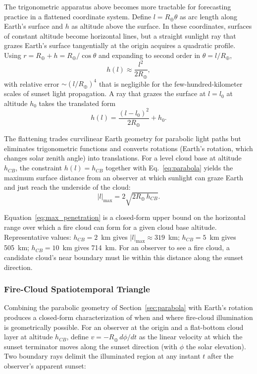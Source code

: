\documentclass[11pt,a4paper]{article}
\begin{document}
The trigonometric apparatus above becomes more tractable for forecasting practice in a flattened coordinate system. Define $l = R_\oplus \theta$ as arc length along Earth's surface and $h$ as altitude above the surface. In these coordinates, surfaces of constant altitude become horizontal lines, but a straight sunlight ray that grazes Earth's surface tangentially at the origin acquires a quadratic profile. Using $r = R_\oplus + h = R_\oplus / \cos\theta$ and expanding to second order in $\theta = l / R_\oplus$,
\begin{equation}
h(l) \approx \frac{l^2}{2 R_\oplus},
\label{eq:parabola}
\end{equation}
with relative error $\sim (l / R_\oplus)^4$ that is negligible for the few-hundred-kilometer scales of sunset light propagation. A ray that grazes the surface at $l = l_0$ at altitude $h_0$ takes the translated form
\begin{equation}
h(l) = \frac{(l - l_0)^2}{2 R_\oplus} + h_0.
\label{eq:parabola_translated}
\end{equation}

The flattening trades curvilinear Earth geometry for parabolic light paths but eliminates trigonometric functions and converts rotations (Earth's rotation, which changes solar zenith angle) into translations. For a level cloud base at altitude $h_{CB}$, the constraint $h(l) = h_{CB}$ together with Eq.~\ref{eq:parabola} yields the maximum surface distance from an observer at which sunlight can graze Earth and just reach the underside of the cloud:
\begin{equation}
|l|_{\max} = 2 \sqrt{2 R_\oplus \, h_{CB}}.
\label{eq:max_penetration}
\end{equation}

Equation~\ref{eq:max_penetration} is a closed-form upper bound on the horizontal range over which a fire cloud can form for a given cloud base altitude. Representative values: $h_{CB} = 2$~km gives $|l|_{\max} \approx 319$~km; $h_{CB} = 5$~km gives 505~km; $h_{CB} = 10$~km gives 714~km. For an observer to see a fire cloud, a candidate cloud's near boundary must lie within this distance along the sunset direction.

\subsubsection{Fire-Cloud Spatiotemporal Triangle}
\label{sec:triangle}

Combining the parabolic geometry of Section~\ref{sec:parabola} with Earth's rotation produces a closed-form characterization of when and where fire-cloud illumination is geometrically possible. For an observer at the origin and a flat-bottom cloud layer at altitude $h_{CB}$, define $v = -R_\oplus \, d\phi/dt$ as the linear velocity at which the sunset terminator moves along the sunset direction (with $\phi$ the solar elevation). Two boundary rays delimit the illuminated region at any instant $t$ after the observer's apparent sunset:
\end{document}
